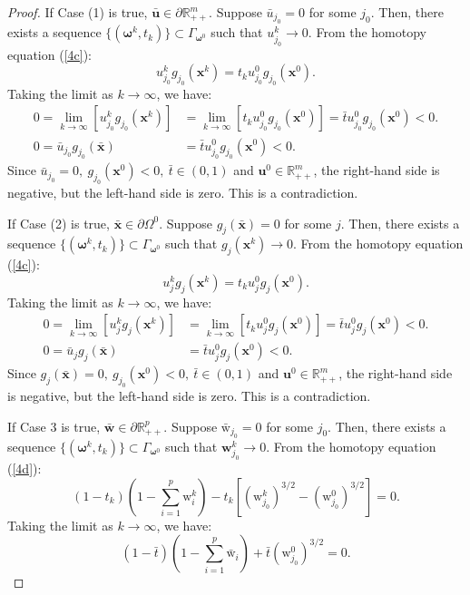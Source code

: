 \documentclass[11pt,pdflatex,sn-mathphys-ay]{sn-jnl}%
\theoremstyle{definition}
\theoremstyle{thmstyleone}%
\theoremstyle{thmstyletwo}%
\theoremstyle{thmstylethree}%
\begin{document}
\begin{proof}
		\noindent 
		If Case (1) is true, $\bar{\bm{u}} \in \partial \mathbb{R}^m_{++}$. Suppose $\bar{u}_{j_0} = 0$ for some $j_0$. Then, there exists a sequence $\{(\bm{\omega}^k, t_k)\} \subset \Gamma_{\bm{\omega}^0}$ such that $u^k_{j_0} \to 0$. From the homotopy equation (\ref{4c}):
		\[
		u^k_{j_0} g_{j_0}(\bm{x}^k) = t_k u^0_{j_0} g_{j_0}(\bm{x}^0).
		\]
		Taking the limit as $k \to \infty$, we have:
		\begin{align*}
			0 = \lim_{k\rightarrow \infty} \left[u^k_{j_0}g_{j_0}(\bm{x}^k) \right] &= \lim_{k\rightarrow \infty} \left[t_ku^0_{j_0}g_{j_0}(\bm{x}^0) \right] = 
			\bar t u_{j_0}^0g_{j_0}(\bm{x}^0) <0.\\
			0 = \bar{u}_{j_0} g_{j_0}(\bar{\bm{x}}) &= \bar{t} u^0_{j_0} g_{j_0}(\bm{x}^0) < 0.
		\end{align*}
		Since $\bar{u}_{j_0} = 0, ~ g_{j_0}(\bm{x}^0) < 0, ~\bar t \in (0,1)$ and $\bm{u}^0 \in \mathbb{R}_{++}^{m}$, the right-hand side is negative, but the left-hand side is zero. This is a contradiction.
		
		\noindent If Case (2) is true, $\bar{\bm{x}} \in \partial \Omega^0.$ Suppose $g_j(\bar{\bm{x}}) = 0$ for some $j$. Then, there exists a sequence $\{(\bm{\omega}^k, t_k)\} \subset \Gamma_{\bm{\omega}^0}$ such that $g_j(\bm{x}^k) \to 0$. From the homotopy equation (\ref{4c}):
		\[
		u^k_j g_j(\bm{x}^k) = t_k u^0_j g_j(\bm{x}^0).
		\]
		Taking the limit as $k \to \infty$, we have:
		\begin{align*}
			0 = \lim_{k\rightarrow \infty} \left[u^k_{j}g_{j}(\bm{x}^k) \right] &= \lim_{k\rightarrow \infty} \left[t_ku^0_{j}g_{j}(\bm{x}^0) \right] = 
			\bar t u_{j}^0g_{j}(\bm{x}^0) <0.\\
			0 = \bar{u}_j g_j(\bar{\bm{x}}) &= \bar{t} u^0_j g_j(\bm{x}^0) < 0.
		\end{align*}
		Since $g_j(\bar{\bm{x}}) = 0, ~ g_{j_0}(\bm{x}^0) < 0, ~\bar t \in (0,1)$ and $\bm{u}^0 \in \mathbb{R}_{++}^{m}$, the right-hand side is negative, but the left-hand side is zero. This is a contradiction.
		
		
		\noindent If Case 3 is true, $\bar{\textbf{w}} \in \partial \mathbb{R}^p_{++}.$ Suppose $\bar{\text{w}}_{j_0} = 0$ for some $j_0$. Then, there exists a sequence $\{(\bm{\omega}^k, t_k)\} \subset \Gamma_{\bm{\omega}^0}$ such that $\textbf{w}^k_{j_0} \to 0$. From the homotopy equation (\ref{4d}):
		\[\displaystyle
		(1 - t_k)\left(1 - \sum_{i=1}^p \text{w}^k_i\right) - t_k \left[ (\text{w}^k_{j_0})^{3/2} - (\text{w}^0_{j_0})^{3/2} \right] = 0.
		\]
		Taking the limit as $k \to \infty$, we have:
		\begin{equation} \label{eq: sum_alternative}
			(1 - \bar{t})\left(1 - \sum_{i=1}^p \bar{\text{w}}_i\right) + \bar{t} (\text{w}^0_{j_0})^{3/2} = 0.
		\end{equation}
		

\end{proof}
\end{document}
